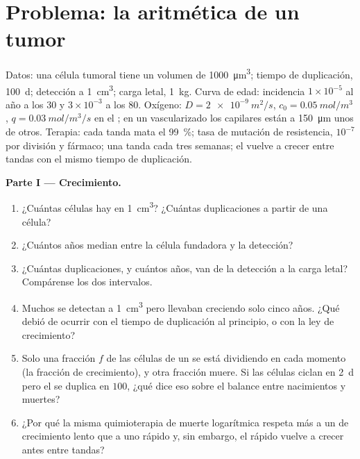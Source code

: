 \section{Problema: la aritmética de un tumor}

\begin{problem}
\label{pb:b3:cancer-biology:1}
Datos: una célula tumoral tiene un volumen de \qty{1000}{\micro m^3};
tiempo de duplicación, \qty{100}{d}; detección a \qty{1}{cm^3}; carga
letal, \qty{1}{kg}. Curva de edad: incidencia $1\times 10^{-5}$ al año a
los $30$ y $3\times
10^{-3}$ a los $80$. Oxígeno: $D = \qty{2e-9}{m^2/s}$, $c_{0} =
\qty{0.05}{mol/m^3}$,
$q = \qty{0.03}{mol/m^3/s}$ en el ; en un  vascularizado los
capilares están a \qty{150}{\micro m} unos de otros. Terapia: cada tanda
mata el \qty{99}{\%}; tasa de mutación de resistencia, $10^{-7}$ por
división y fármaco; una tanda cada tres semanas; el  vuelve a crecer
entre tandas con el mismo tiempo de duplicación.

\medskip
\noindent\textbf{Parte I --- Crecimiento.}
\begin{enumerate}
  \item ¿Cuántas células hay en \qty{1}{cm^3}? ¿Cuántas duplicaciones a
        partir de una célula?
  \item ¿Cuántos años median entre la célula fundadora y la detección?
  \item ¿Cuántas duplicaciones, y cuántos años, van de la detección a la
        carga letal? Compárense los dos intervalos.
  \item Muchos  se detectan a \qty{1}{cm^3} pero llevaban
        creciendo solo cinco años. ¿Qué debió de ocurrir con el tiempo de
        duplicación al principio, o con la ley de crecimiento?
  \item Solo una fracción $f$ de las células de un  se está
        dividiendo en cada momento (la fracción de crecimiento), y otra
        fracción muere. Si las células ciclan en \qty{2}{d} pero el 
        se duplica en $100$, ¿qué dice eso sobre el balance entre
        nacimientos y muertes?
  \item ¿Por qué la misma quimioterapia de muerte logarítmica respeta más
        a un  de crecimiento lento que a uno rápido y, sin embargo,
        el rápido vuelve a crecer antes entre tandas?
\end{enumerate}


\end{problem}
